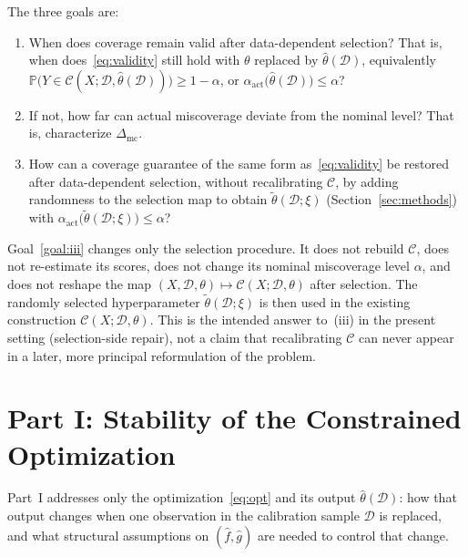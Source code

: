 \documentclass[12pt]{article}
\theoremstyle{plain}
\begin{document}
The three goals are:
\begin{enumerate}[label=(\roman*),leftmargin=*,ref=(\roman*)]
  \item\label{goal:i}
        When does coverage remain valid after data-dependent selection?
        That is, when does~\eqref{eq:validity} still hold with $\theta$ replaced by $\hat\theta(\mathcal{D})$, equivalently
        $\mathbb{P}\bigl(Y\in\mathcal{C}(X;\mathcal{D},\hat\theta(\mathcal{D}))\bigr)\ge 1-\alpha$,
        or $\alpha_{\mathrm{act}}\bigl(\hat\theta(\mathcal{D})\bigr)\le\alpha$?
  \item\label{goal:ii}
        If not, how far can actual miscoverage deviate from the nominal level?
        That is, characterize $\Delta_{\mathrm{mc}}$.
  \item\label{goal:iii}
        How can a coverage guarantee of the same form as~\eqref{eq:validity} be restored after data-dependent selection,
        without recalibrating $\mathcal{C}$,
        by adding randomness to the selection map to obtain $\widetilde\theta(\mathcal{D};\xi)$
        (Section~\ref{sec:methods}) with $\alpha_{\mathrm{act}}\bigl(\widetilde\theta(\mathcal{D};\xi)\bigr)\le\alpha$?
\end{enumerate}
\label{rem:goal-iii}
Goal~\ref{goal:iii} changes only the selection procedure.
It does not rebuild $\mathcal{C}$, does not re-estimate its scores, does not change its nominal miscoverage level $\alpha$, and does not reshape the map $(X,\mathcal{D},\theta)\mapsto\mathcal{C}(X;\mathcal{D},\theta)$ after selection.
The randomly selected hyperparameter $\widetilde\theta(\mathcal{D};\xi)$ is then used in the existing construction $\mathcal{C}(X;\mathcal{D},\theta)$.
This is the intended answer to~(iii) in the present setting (selection-side repair), not a claim that recalibrating $\mathcal{C}$ can never appear in a later, more principal reformulation of the problem.

\section{Part I: Stability of the Constrained Optimization}
\label{sec:part-i}

Part~I addresses only the optimization~\eqref{eq:opt} and its output $\hat\theta(\mathcal{D})$: how that output changes when one observation in the calibration sample $\mathcal{D}$ is replaced, and what structural assumptions on $(\hat f,\hat g)$ are needed to control that change.
\end{document}
